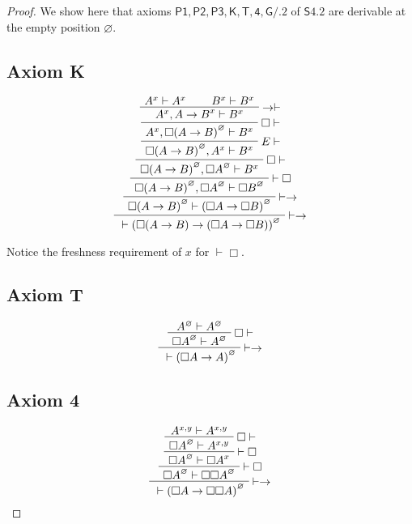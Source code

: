 \documentclass{article}
\newcommand{\seq}[2]{{#1} \vdash{} {#2}}
\newcommand{\pf}[2]{{#1}^{#2}} %
\newcommand{\logic}{\mathsf{S4.2}}
\newcommand{\axname}[1]{\mathsf{#1}}
\newcommand{\commento}[1]{}
\theoremstyle{definition}
\begin{document}
\begin{proof}

We show here that axioms $\axname{P1}, \axname{P2}, \axname{P3}, \axname{K}, \axname{T}, \axname{4}, \axname{G/.2}$ of $\logic$ are derivable at the empty position $\varnothing$.

\commento{
\ExecuteMetaData[Chapter2.tex]{axiom1}

\ExecuteMetaData[Chapter2.tex]{axiom2}

\ExecuteMetaData[Chapter2.tex]{axiom3}
}

\subsection*{Axiom K}
\[
\AxiomC{$\seq{\pf{A}{x}}{\pf{A}{x}}$}
\AxiomC{$\seq{\pf{B}{x}}{\pf{B}{x}}$}
\RightLabel{$\rightarrow \vdash$}
\BinaryInfC{$\seq{\pf{A}{x}, \pf{A \rightarrow B}{x}}{\pf{B}{x}}$}
\RightLabel{$\Box \vdash$}
\UnaryInfC{$\seq{\pf{A}{x}, \pf{\Box(A \rightarrow B)}{\varnothing}}{\pf{B}{x}}$}
\RightLabel{$E\vdash$}
\UnaryInfC{$\seq{\pf{\Box(A \rightarrow B)}{\varnothing}, \pf{A}{x}}{\pf{B}{x}}$}
\RightLabel{$\Box \vdash$}
\UnaryInfC{$\seq{\pf{\Box(A \rightarrow B)}{\varnothing}, \pf{\Box A}{\varnothing}}{\pf{B}{x}}$}
\RightLabel{$\vdash \Box$}
\UnaryInfC{$\seq{\pf{\Box(A \rightarrow B)}{\varnothing}, \pf{\Box A}{\varnothing}}{\pf{\Box B}{\varnothing}}$}
\RightLabel{$\vdash \rightarrow$}
\UnaryInfC{$\seq{\pf{\Box(A \rightarrow B)}{\varnothing}}{\pf{(\Box A \rightarrow \Box B)}{\varnothing}}$}
\RightLabel{$\vdash \rightarrow$}
\UnaryInfC{$\seq{}{\pf{(\Box(A \rightarrow B) \rightarrow (\Box A \rightarrow \Box B))}{\varnothing}}$}
\DisplayProof
\]




Notice the freshness requirement of $x$ for $\vdash \Box$.
\subsection*{Axiom T}
\[
\AxiomC{$\seq{\pf{A}{\varnothing}}{\pf{A}{\varnothing}}$}
\RightLabel{$\Box \vdash$}
\UnaryInfC{$\seq{\pf{\Box A}{\varnothing}}{\pf{A}{\varnothing}}$}
\RightLabel{$\vdash \rightarrow$}
\UnaryInfC{$\seq{}{\pf{(\Box A \rightarrow A)}{\varnothing}}$}
\DisplayProof
\]

\subsection*{Axiom 4}
\[
\AxiomC{$\seq{\pf{A}{x,y}}{\pf{A}{x,y}}$}
\RightLabel{$\Box \vdash$}
\UnaryInfC{$\seq{\pf{\Box A}{\varnothing}}{\pf{A}{x,y}}$}
\RightLabel{$\vdash \Box$}
\UnaryInfC{$\seq{\pf{\Box A}{\varnothing}}{\pf{\Box A}{x}}$}
\RightLabel{$\vdash \Box$}
\UnaryInfC{$\seq{\pf{\Box A}{\varnothing}}{\pf{\Box \Box A}{\varnothing}}$}
\RightLabel{$\vdash \rightarrow$}
\UnaryInfC{$\seq{}{\pf{(\Box A \rightarrow \Box \Box A)}{\varnothing}}$}
\DisplayProof
\]


\end{proof}
\end{document}
